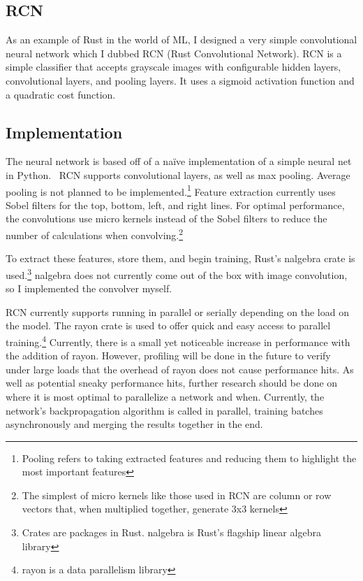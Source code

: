 \begin{multicols}{2}
\section{RCN}
As an example of Rust in the world of ML, I designed a very simple convolutional neural network which I dubbed RCN (Rust
Convolutional Network). RCN is a simple classifier that accepts grayscale images with configurable hidden layers,
convolutional layers, and pooling layers. It uses a sigmoid activation function and a quadratic cost function.

\subsection{Implementation}
The neural network is based off of a na\"ive implementation of a simple neural net in Python.~\cite{nnanddeeplearning}
RCN supports convolutional layers, as well as max pooling. Average pooling is not planned to be implemented.\footnote{
Pooling refers to taking extracted features and reducing them to highlight the most important features} Feature extraction
currently uses Sobel filters for the top, bottom, left, and right lines. For optimal performance, the convolutions use
micro kernels instead of the Sobel filters to reduce the number of calculations when convolving.\footnote{The simplest
of micro kernels like those used in RCN are column or row vectors that, when multiplied together, generate 3x3 kernels}

To extract these features, store them, and begin training, Rust's nalgebra crate is used.\footnote{Crates are packages
in Rust. nalgebra is Rust's flagship linear algebra library} nalgebra does not currently come out of the box with image
convolution, so I implemented the convolver myself.

RCN currently supports running in parallel or serially depending on the load on the model. The rayon crate is used to offer quick and
easy access to parallel training.\footnote{rayon is a data parallelism library}
Currently, there is a small yet noticeable increase in performance with the addition of rayon. However, profiling will be
done in the future to verify under large loads that the overhead of rayon does not cause performance hits. As well as potential
sneaky performance hits, further research should be done on where it is most optimal to parallelize a network and when.
Currently, the network's backpropagation algorithm is called in parallel, training batches asynchronously and merging the results
together in the end.


\end{multicols}
